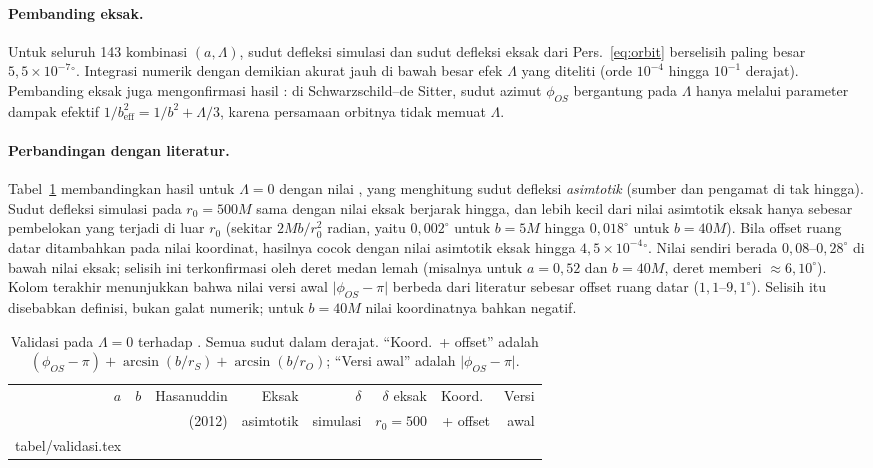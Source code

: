 \documentclass[11pt,a4paper]{article}
\makeatletter
\newcommand{\isitabel}[1]{\@@input #1 }
\makeatother
\begin{document}
\paragraph{Pembanding eksak.} Untuk seluruh 143 kombinasi $(a, \Lambda)$, sudut defleksi simulasi dan
sudut defleksi eksak dari Pers.~\eqref{eq:orbit} berselisih paling besar $5{,}5\times10^{-7}{}^\circ$. Integrasi
numerik dengan demikian akurat jauh di bawah besar efek $\Lambda$ yang diteliti (orde $10^{-4}$ hingga
$10^{-1}$ derajat). Pembanding eksak juga mengonfirmasi hasil \citet{rindler2007contribution}: di
Schwarzschild--de Sitter, sudut azimut $\phi_{OS}$ bergantung pada $\Lambda$ hanya melalui parameter dampak
efektif $1/b_\text{eff}^2 = 1/b^2 + \Lambda/3$, karena persamaan orbitnya tidak memuat $\Lambda$.

\paragraph{Perbandingan dengan literatur.} Tabel~\ref{tab:validasi} membandingkan hasil untuk
$\Lambda = 0$ dengan nilai \citet{hasanuddin2012pembelokan}, yang menghitung sudut defleksi
\emph{asimtotik} (sumber dan pengamat di tak hingga). Sudut defleksi simulasi pada $r_0 = 500M$ sama dengan
nilai eksak berjarak hingga, dan lebih kecil dari nilai asimtotik eksak hanya sebesar pembelokan yang
terjadi di luar $r_0$ (sekitar $2Mb/r_0^2$ radian, yaitu $0{,}002^\circ$ untuk $b = 5M$ hingga $0{,}018^\circ$
untuk $b = 40M$). Bila offset ruang datar ditambahkan pada nilai koordinat, hasilnya cocok dengan nilai
asimtotik eksak hingga $4{,}5\times10^{-4}{}^\circ$. Nilai \citet{hasanuddin2012pembelokan} sendiri berada
$0{,}08$--$0{,}28^\circ$ di bawah nilai eksak; selisih ini terkonfirmasi oleh deret medan lemah (misalnya
untuk $a = 0{,}52$ dan $b = 40M$, deret memberi $\approx 6{,}10^\circ$). Kolom terakhir menunjukkan bahwa
nilai versi awal $\lvert\phi_{OS} - \pi\rvert$ berbeda dari literatur sebesar offset ruang datar
($1{,}1$--$9{,}1^\circ$). Selisih itu disebabkan definisi, bukan galat numerik; untuk $b = 40M$ nilai
koordinatnya bahkan negatif.

\begin{table}[t]
  \centering
  \small
  \caption{Validasi pada $\Lambda = 0$ terhadap \citet{hasanuddin2012pembelokan}. Semua sudut dalam derajat.
    ``Koord.\ + offset'' adalah $(\phi_{OS} - \pi) + \arcsin(b/r_S) + \arcsin(b/r_O)$; ``Versi awal'' adalah
    $\lvert\phi_{OS} - \pi\rvert$.}
  \label{tab:validasi}
  \begin{tabular}{rrrrrrrr}
    \toprule
    $a$ & $b$ & Hasanuddin & Eksak & $\delta$ & $\delta$ eksak & Koord.\ & Versi \\
        &     & (2012)     & asimtotik & simulasi & $r_0 = 500$ & + offset & awal \\
    \midrule
    \isitabel{tabel/validasi.tex}
    \bottomrule
  \end{tabular}
\end{table}
\end{document}
